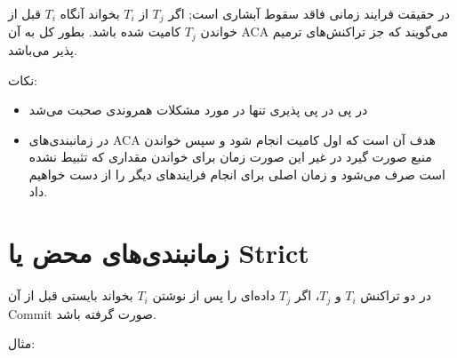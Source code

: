 \documentclass[a4paper]{article}
\begin{document}
در حقیقت فرایند زمانی فاقد سقوط آبشاری است; اگر $T_{j}$ از $T_{i}$ بخواند آنگاه
$T_{i}$ قبل از خواندن $T_{j}$ کامیت شده باشد. بطور کل به آن ACA می‌گویند که جز
تراکنش‌های ترمیم پذیر می‌باشد.

\begin{LTR}
    \begin{table}[h]
        \centering
        \begin{RTL}
            \caption{نمونه‌ای از فرایند ACA}
        \end{RTL}
    \end{table}
\end{LTR}

نکات:

\begin{itemize}
    \item در پی در پی پذیری تنها در مورد مشکلات همروندی صحبت می‌شد
    \item در زمانبندی‌های ACA هدف آن است که اول کامیت انجام شود و سپس خواندن
    منبع صورت گیرد در غیر این صورت زمان برای خواندن مقداری که تثبیط نشده است صرف
    می‌شود و زمان اصلی برای انجام فرایند‌های دیگر را از دست خواهیم داد.
\end{itemize}

\section{زمانبندی‌های محض یا Strict}

در دو تراکنش $T_{i}$ و $T_{j}$، اگر $T_{j}$ داده‌ای را پس از نوشتن $T_{i}$
بخواند بایستی قبل از آن Commit صورت گرفته باشد.

مثال: 

\begin{LTR}
    \begin{table}[h]
        \centering
        \begin{RTL}
            \caption{نمونه‌ای از زمانبندی محض}
        \end{RTL}
    \end{table}
\end{LTR}
\end{document}

